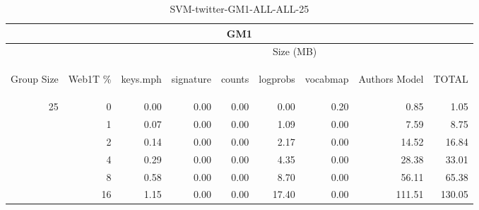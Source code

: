 \begin{center}
\begin{table}[htbp] 
 \begin{center}
\begin{tabular}{ | r | r | r | r | r | r | r | r | r |}
\hline
\multicolumn{9}{|c|}{GM1}\\
\hline
 & & \multicolumn{7}{|c|}{Size (MB)}\\ \cline{3-9}
\begin{sideways}Group Size\end{sideways} & \begin{sideways}Web1T \% \end{sideways} & \begin{sideways}keys.mph\end{sideways} & \begin{sideways}signature\end{sideways} & \begin{sideways}counts\end{sideways} & \begin{sideways}logprobs\end{sideways} & \begin{sideways}vocabmap\end{sideways} & \begin{sideways}Authors Model \end{sideways} & \begin{sideways}TOTAL\end{sideways}\\
\hline
\multirow{5}{*}{25}
 & 0 & 0.00 & 0.00 & 0.00 & 0.00 & 0.20 & 0.85 & 1.05\\ \cline{2-9}
 & 1 & 0.07 & 0.00 & 0.00 & 1.09 & 0.00 & 7.59 & 8.75\\ \cline{2-9}
 & 2 & 0.14 & 0.00 & 0.00 & 2.17 & 0.00 & 14.52 & 16.84\\ \cline{2-9}
 & 4 & 0.29 & 0.00 & 0.00 & 4.35 & 0.00 & 28.38 & 33.01\\ \cline{2-9}
 & 8 & 0.58 & 0.00 & 0.00 & 8.70 & 0.00 & 56.11 & 65.38\\ \cline{2-9}
 & 16 & 1.15 & 0.00 & 0.00 & 17.40 & 0.00 & 111.51 & 130.05\\ \cline{2-9}
\hline
\end{tabular}
\caption{SVM-twitter-GM1-ALL-ALL-25}
\label{table:SVM-twitter-GM1-ALL-ALL-25}
\end{center}
 \end{table}
\end{center}

